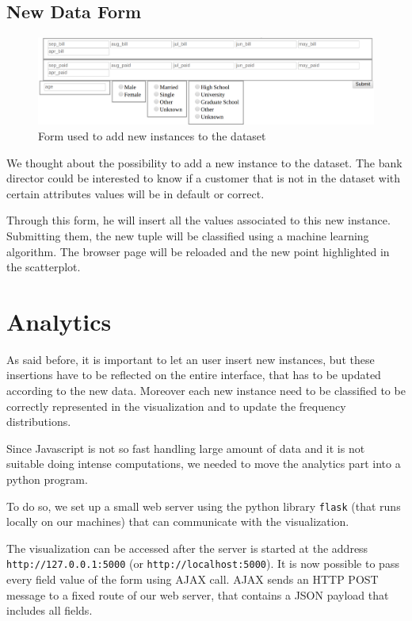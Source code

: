 \documentclass[journal]{vgtc}                %
\begin{document}
\subsection{New Data Form}
\begin{figure}[h]
  \centering
  \includegraphics[scale=0.1]{form}
  \caption{Form used to add new instances to the dataset}
  \label{form}
\end{figure}


We thought about the possibility to add a new instance to the dataset. The bank director could be interested to know if a customer that is not in the dataset with certain attributes values
will be in default or correct.

Through this form, he will insert all the values associated to this new instance. Submitting them, the new tuple will be classified
using a machine learning algorithm. The browser page will be reloaded and the new point highlighted in the scatterplot.

\section{Analytics}

As said before, it is important to let an user insert new instances, but these insertions have to be reflected on the entire interface, that has to be updated according to the new data.
Moreover each new instance need to be classified to be correctly represented in the visualization and to update the frequency distributions.

Since Javascript is not so fast handling large amount of data and it is not suitable doing intense computations, we needed to move the analytics part into a python program.

To do so, we set up a small web server using the python library \texttt{flask} (that runs locally on our machines) that can communicate with the visualization.

The visualization can be accessed after the server is started at the address \texttt{http://127.0.0.1:5000} (or \texttt{http://localhost:5000}). It is now possible to pass every field value of the form
using AJAX call. AJAX sends an HTTP POST message to a fixed route of our web server, that contains a JSON payload that includes all fields.
\end{document}
